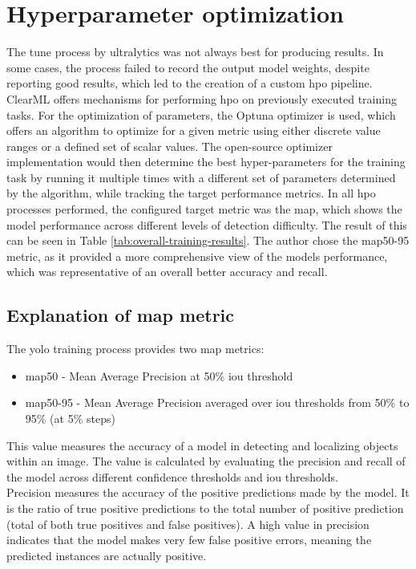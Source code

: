 \documentclass[Bachelor, BIC, english, fhCitStyle, IEEE]{BASE/twbook} %
\newcommand{\nocontentsline}[3]{}
\newcommand{\hidsubsection}[1]{\bgroup\let\addcontentsline=\nocontentsline\subsection{#1}\egroup}
\begin{document}
\section{Hyperparameter optimization}
The tune process by ultralytics was not always best for producing results. In some cases, the process failed to record the output model weights, despite reporting good results, which led to the creation of a custom \ac{hpo} pipeline.\\
ClearML offers mechanisms for performing \ac{hpo} \autocite{HyperparameterOptimizationClearML} on previously executed training tasks. For the optimization of parameters, the Optuna optimizer \autocite{OptunaHyperparameterOptimization} is used, which offers an algorithm to optimize for a given metric using either discrete value ranges or a defined set of scalar values. The open-source optimizer implementation would then determine the best hyper-parameters for the training task by running it multiple times with a different set of parameters determined by the algorithm, while tracking the target performance metrics. In all \ac{hpo} processes performed, the configured target metric was the \ac{map}, which shows the model performance across different levels of detection difficulty. The result of this can be seen in Table \ref{tab:overall-training-results}. The author chose the \ac{map}50-95 metric, as it provided a more comprehensive view of the models performance, which was representative of an overall better accuracy and recall.
\hidsubsection{Explanation of \ac{map} metric}\label{map-explanation}
\noindent
The \ac{yolo} training process provides two \ac{map} metrics:
\begin{itemize}
    \item \ac{map}50 - Mean Average Precision at 50\% \ac{iou} threshold
    \item \ac{map}50-95 - Mean Average Precision averaged over \ac{iou} thresholds from 50\% to 95\% (at 5\% steps)
\end{itemize}
This value measures the accuracy of a model in detecting and localizing objects within an image. The value is calculated by evaluating the precision and recall of the model across different confidence thresholds and \ac{iou} thresholds.\\
Precision measures the accuracy of the positive predictions made by the model. It is the ratio of true positive predictions to the total number of positive prediction (total of both true positives and false positives). A high value in precision indicates that the model makes very few false positive errors, meaning the predicted instances are actually positive.\\
\end{document}
